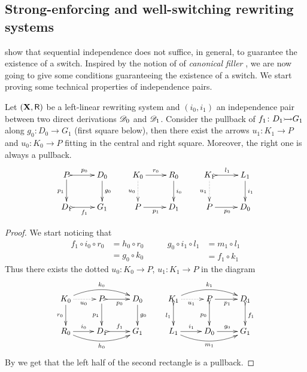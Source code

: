 \subsection{Strong-enforcing and well-switching rewriting systems}

 show that sequential independence does not suffice, in general, to guarantee the existence of a switch.  Inspired by the notion of of \emph{canonical filler}
\cite{heindel2009category}, we are now going to give some conditions guaranteeing the existence of a switch. We start proving some technical properties of independence pairs.



\begin{proposition}
	\label{prop:tec}
	Let $(\textbf {\textup{X}},\mathsf{R})$ be a left-linear rewriting system and
	$(i_0, i_1)$ an independence pair between two direct
	derivations $\mathscr{D}_0$ and $\mathscr{D}_1$. Consider the pullback of
	$f_1\colon D_1\mto G_1$ along $g_0\colon D_0\to G_1$ (first
	square below), then there exist the arrows
	$u_1\colon K_1\to P$ and $u_0\colon K_0\to P$ fitting in the
	central and right square. Moreover, the right one is always
	a pullback.
	\[\xymatrix{P \ar@{>->}[r]^{p_0} \ar[d]_{p_1} & D_0
		\ar[d]^{g_0}& K_0 \ar[r]^{r_0} \ar@{.>}[d]_{u_0}& R_0
		\ar[d]^{i_0} & K_1 \ar@{>->}[r]^{l_1} \ar@{.>}[d]_{u_1}&
		L_1 \ar[d]^{i_1}\\ D_1 \ar@{>->}[r]_{f_1} &G_1 &P
		\ar[r]_{p_1} & D_1 &P \ar[r]_{p_0} & D_0}
	\]
\end{proposition}

\begin{proof}
	We start noticing that
	\[\begin{split}
	f_1\circ i_0\circ r_0&=h_0\circ r_0\\&=g_0\circ k_0	\end{split}
	 \qquad\begin{split}
	 	g_0\circ i_1\circ l_1&=m_1\circ l_1\\&= f_1 \circ k_1
	 \end{split}
	\]
	Thus there exists the dotted $u_0\colon K_0\to P$,
	$u_1\colon K_1\to P$ in the diagram
	\[\xymatrix{K_0 \ar[d]_{r_0}
		\ar@{.>}[r]_{u_0}\ar@/^.4cm/[rr]^{k_0} &P
		\ar@{>->}[r]_{p_0} \ar[d]_{p_1}& D_0 \ar[d]^{g_0}&K_1
		\ar@{>->}[d]_{l_1}
		\ar@{.>}[r]_{u_1}\ar@/^.4cm/[rr]^{k_1} &P \ar[r]_{p_1}
		\ar@{>->}[d]_{p_0}& D_1 \ar@{>->}[d]^{f_1}\\R_0
		\ar@/_.4cm/[rr]_{h_0}\ar[r]^{i_0}& D_1
		\ar@{>->}[r]^{f_1}& G_1&L_1
		\ar@/_.4cm/[rr]_{m_1}\ar[r]^{i_1}& D_0 \ar[r]^{g_0}&
		G_1}\]
	By  we get that the left half of
	the second rectangle is a pullback.
	\qedhere
\end{proof}


